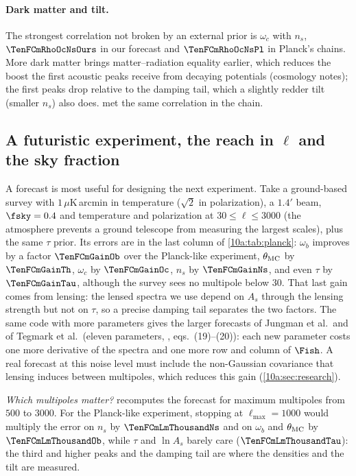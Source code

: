 \paragraph{Dark matter and tilt.} The strongest correlation not broken by an external prior is $\omega_c$ with $n_s$,
$\TenFCmRhoOcNsOurs$ in our forecast and $\TenFCmRhoOcNsPl$ in Planck's chains. More dark matter brings matter--radiation
equality earlier, which reduces the boost the first acoustic peaks receive from decaying potentials (cosmology
notes); the first peaks drop relative to the damping tail, which a slightly redder tilt (smaller $n_s$) also does.
 met the same correlation in the chain.

\subsection{A futuristic experiment, the reach in \texorpdfstring{$\ell$}{l} and the sky fraction}
\label{10a:sec:cmb-future}

A forecast is most useful for designing the next experiment. Take a ground-based survey with $1\,\mu$K\,arcmin in
temperature ($\sqrt2$ in polarization), a $1.4'$ beam, $\fsky=0.4$ and temperature and polarization at
$30\le\ell\le3000$ (the atmosphere prevents a ground telescope from measuring the largest scales), plus the same $\tau$
prior. Its errors are in the last column of \cref{10a:tab:planck}: $\omega_b$ improves by a factor $\TenFCmGainOb$ over the
Planck-like experiment, $\theta_{\rm MC}$ by $\TenFCmGainTh$, $\omega_c$ by $\TenFCmGainOc$, $n_s$ by $\TenFCmGainNs$, and even $\tau$ by
$\TenFCmGainTau$, although the survey sees no multipole below $30$. That last gain comes from lensing: the lensed
spectra we use depend on $A_s$ through the lensing strength but not on $\tau$, so a precise damping tail separates
the two factors. The same code with more parameters gives the larger forecasts of Jungman et al.\ and of Tegmark et al.\ (eleven parameters, \cite{TTH1997}, eqs.~(19)--(20)): each new parameter costs one more derivative of the spectra and one more row and column of $\Fish$. A real forecast at this noise level must include the non-Gaussian covariance that lensing
induces between multipoles, which reduces this gain (\cref{10a:sec:research}).

\emph{Which multipoles matter?}  recomputes the forecast for maximum multipoles from $500$ to
$3000$. For the Planck-like experiment, stopping at $\ell_{\max}=1000$ would multiply the error on $n_s$ by $\TenFCmLmThousandNs$
and on $\omega_b$ and $\theta_{\rm MC}$ by $\TenFCmLmThousandOb$, while $\tau$ and $\ln A_s$ barely care ($\TenFCmLmThousandTau$): the third
and higher peaks and the damping tail are where the densities and the tilt are measured.

